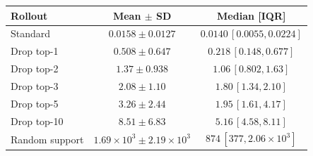 \begin{tabular}{@{}lcc@{}}
\toprule
Rollout & Mean \(\pm\) SD & Median [IQR] \\
\midrule
Standard & $0.0158{\pm}0.0127$ & $0.0140\,[0.0055,0.0224]$ \\
Drop top-1 & $0.508{\pm}0.647$ & $0.218\,[0.148,0.677]$ \\
Drop top-2 & $1.37{\pm}0.938$ & $1.06\,[0.802,1.63]$ \\
Drop top-3 & $2.08{\pm}1.10$ & $1.80\,[1.34,2.10]$ \\
Drop top-5 & $3.26{\pm}2.44$ & $1.95\,[1.61,4.17]$ \\
Drop top-10 & $8.51{\pm}6.83$ & $5.16\,[4.58,8.11]$ \\
Random support & $1.69{\times}10^{3}{\pm}2.19{\times}10^{3}$ & $874\,[377,2.06{\times}10^{3}]$ \\
\bottomrule
\end{tabular}
